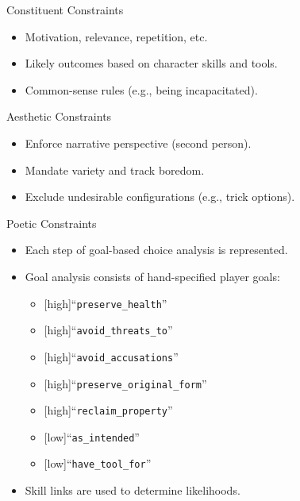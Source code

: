 \documentclass[xcolor=x11names]{beamer}
\newcommand{\prq}[2]{``\texttt{#1}{#2}''}
\begin{document}
\begin{frame}{Constituent Constraints}
  \begin{itemize}\addtolength{\itemsep}{0.5\baselineskip}
    \item Motivation, relevance, repetition, etc.
    \item Likely outcomes based on character skills and tools.
    \item Common-sense rules (e.g., being incapacitated).
  \end{itemize}
\end{frame}

\begin{frame}{Aesthetic Constraints}
  \begin{itemize}\addtolength{\itemsep}{0.5\baselineskip}
    \item Enforce narrative perspective (second person).
    \item Mandate variety and track boredom.
    \item Exclude undesirable configurations (e.g., trick options).
  \end{itemize}
\end{frame}

\begin{frame}{Poetic Constraints}
  \begin{itemize}\addtolength{\itemsep}{0.5\baselineskip}
    \item Each step of goal-based choice analysis is represented.
    \item Goal analysis consists of hand-specified player goals:
    \begin{itemize}\addtolength{\itemsep}{0.5\baselineskip}
      \vspace{0.5\baselineskip}
      \item {[high]}\prq{preserve\_health}{}
      \item {[high]}\prq{avoid\_threats\_to}{}
      \item {[high]}\prq{avoid\_accusations}{}
      \item {[high]}\prq{preserve\_original\_form}{}
      \item {[high]}\prq{reclaim\_property}{}
      \item {[low]}\prq{as\_intended}{}
      \item {[low]}\prq{have\_tool\_for}{}
    \end{itemize}
    \item Skill links are used to determine likelihoods.
  \end{itemize}
\end{frame}
\end{document}
